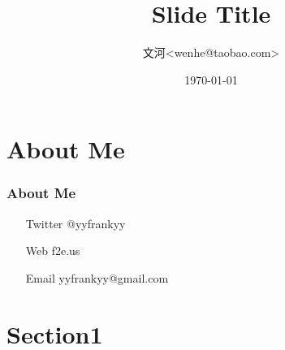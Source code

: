 \documentclass[dvipdfmx]{beamer}
\title{Slide Title}
\author{文河<wenhe@taobao.com>}
\date{\today}
\begin{document}
    \begin{frame}[plain]
        \titlepage
    \end{frame}

    \section[Overview]{}
        \begin{frame}
            \tableofcontents
        \end{frame}

    \section{About Me}
        \begin{frame}
            \frametitle{About Me}

            \begin{itemize}
                \item[Twitter] @yyfrankyy
                \item[Web] f2e.us
                \item[Email] yyfrankyy@gmail.com
            \end{itemize}
        \end{frame}

    \section{Section1}
\end{document}
